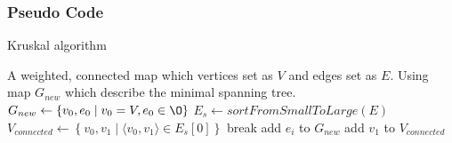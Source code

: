 \documentclass[cs4size, punct, nospace, fancyhdr, fntef]{ctexart}
\begin{document}
      \subsubsection{Pseudo Code}
      \begin{algorithm}
      \caption{Kruskal algorithm}\label{kruskal}
      \begin{algorithmic}[1]
        \Require A weighted, connected map which vertices set as $V$ and edges set as $E$.
        \Ensure Using map $G_{new}$ which describe the minimal spanning tree.
        \State $G_{new}\gets\left\{v_0, e_0 \mid v_0=V, e_0 \in \O  \right\}$
        \State $E_s\gets sortFromSmallToLarge\left(E\right)$
        \State $V_{connected}\gets \left\{v_0, v_1\mid\langle v_0, v_1\rangle \in E_s\left[0\right]\right\}$
            \State break
          \EndIf
            \State add $e_i$ to $G_{new}$
            \State add $v_1$ to $V_{connected}$
          \EndIf
        \EndFor
      \EndFunction
      \end{algorithmic}
      \end{algorithm}
\end{document}

